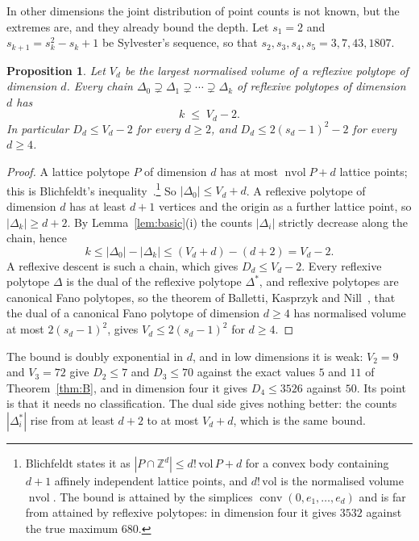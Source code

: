 \documentclass[11pt]{amsart}
\newtheorem{proposition}[theorem]{Proposition}
\theoremstyle{definition}
\theoremstyle{remark}
\newcommand{\Z}{\mathbb{Z}}
\newcommand{\conv}{\operatorname{conv}}
\newcommand{\nvol}{\operatorname{nvol}}
\newcommand{\UBs}{50}
\begin{document}
In other dimensions the joint distribution of point counts is not known,
but the extremes are, and they already bound the depth. Let
$s_1=2$ and $s_{k+1}=s_k^2-s_k+1$ be Sylvester's sequence, so that
$s_2,s_3,s_4,s_5=3,7,43,1807$.

\begin{proposition}\label{prop:everydim}
Let $V_d$ be the largest normalised volume of a reflexive polytope of
dimension $d$. Every chain
$\Delta_0\supsetneq\Delta_1\supsetneq\cdots\supsetneq\Delta_k$ of
reflexive polytopes of dimension $d$ has
\[
k\;\le\;V_d-2 .
\]
In particular $D_d\le V_d-2$ for every $d\ge2$, and
$D_d\le2(s_d-1)^2-2$ for every $d\ge4$.
\end{proposition}

\begin{proof}
A lattice polytope $P$ of dimension $d$ has at most $\nvol P+d$ lattice
points; this is Blichfeldt's inequality~\cite{Bli14}.\footnote{Blichfeldt
states it as $|P\cap\Z^d|\le d!\,\mathrm{vol}\,P+d$ for a convex body
containing $d+1$ affinely independent lattice points, and $d!\,\mathrm{vol}$
is the normalised volume $\nvol$. The bound is attained by the simplices
$\conv(0,e_1,\dots,e_d)$ and is far from attained by reflexive
polytopes: in dimension four it gives $3532$ against the true maximum
$680$.} So $|\Delta_0|\le V_d+d$. A reflexive polytope of dimension $d$
has at least $d+1$ vertices and the origin as a further lattice point, so
$|\Delta_k|\ge d+2$. By Lemma~\ref{lem:basic}(i) the counts
$|\Delta_i|$ strictly decrease along the chain, hence
\[
k\le|\Delta_0|-|\Delta_k|\le(V_d+d)-(d+2)=V_d-2 .
\]
A reflexive descent is such a chain, which gives $D_d\le V_d-2$. Every
reflexive polytope $\Delta$ is the dual of the reflexive polytope
$\Delta^*$, and reflexive polytopes are canonical Fano polytopes, so the
theorem of Balletti, Kasprzyk and Nill~\cite{BKN22}, that the dual of a
canonical Fano polytope of dimension $d\ge4$ has normalised volume at most
$2(s_d-1)^2$, gives $V_d\le2(s_d-1)^2$ for $d\ge4$. \end{proof}

The bound is doubly exponential in $d$, and in low dimensions it is weak:
$V_2=9$ and $V_3=72$ give $D_2\le7$ and $D_3\le70$ against the exact values
$5$ and $11$ of Theorem~\ref{thm:B}, and in dimension four it gives
$D_4\le3526$ against $\UBs$. Its point is that it needs no classification.
The dual side gives nothing better: the counts $|\Delta_i^*|$ rise from at
least $d+2$ to at most $V_d+d$, which is the same bound.
\end{document}
